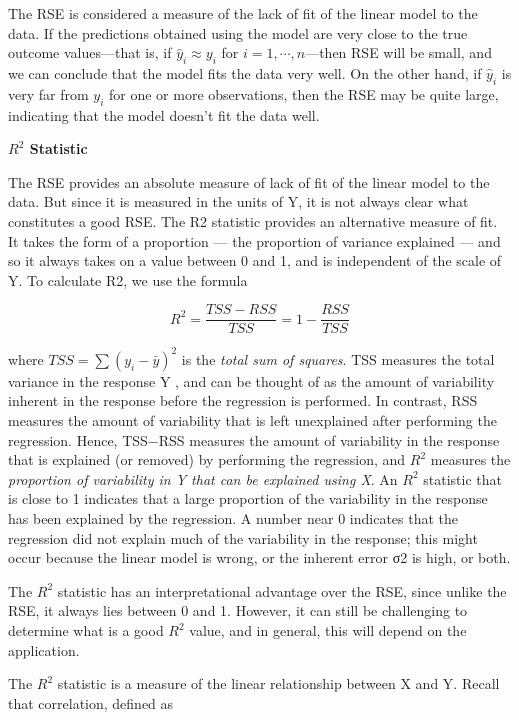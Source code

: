 \documentclass{article}
\theoremstyle{definition}
\theoremstyle{remark}
\begin{document}
	The RSE is considered a measure of the lack of fit of the linear model to the data. If the predictions obtained using the model are very close to the true outcome values---that is, if $\hat{y}_i\approx y_i$ for $i=1,\cdots,n$---then RSE will be small, and we can conclude that the model fits the data very well. On the other hand, if $\hat{y}_i$ is very far from $y_i$ for one or more observations, then the RSE may be quite large, indicating that the model doesn’t fit the data well.
	
	\hspace{\fill}
	
	\textbf{$R^2$ Statistic}
	
	The RSE provides an absolute measure of lack of fit of the linear model  to the data. But since it is measured in the units of Y, it is not always clear what constitutes a good RSE. The R2 statistic provides an alternative measure of fit. It takes the form of a proportion — the proportion of variance explained --- and so it always takes on a value between 0 and 1, and is independent of the scale of Y. To calculate R2, we use the formula
	
	\[
	R^2=\frac{TSS-RSS}{TSS}=1-\frac{RSS}{TSS}
	\]
	
	where $TSS=\sum(y_i-\bar{y})^2$ is the \textit{total sum of squares}. TSS measures the total variance in the response Y , and can be thought of as the amount of variability inherent in the response before the regression is performed. In contrast, RSS measures the amount of variability that is left unexplained after performing the regression. Hence, TSS−RSS measures the amount of variability in the response that is explained (or removed) by performing the regression, and $R^2$ measures the \textit{proportion of variability in Y that can be explained using X}. An $R^2$ statistic that is close to 1 indicates that a large proportion of the variability in the response has been explained by the regression. A number near 0 indicates that the regression did not explain much of the variability in the response; this might occur because the linear model is wrong, or the inherent error σ2 is high, or both.
	
	The $R^2$ statistic has an interpretational advantage over the RSE, since unlike the RSE, it always lies between 0 and 1. However, it can still be challenging to determine what is a good $R^2$ value, and in general, this will depend on the application.
	
	The $R^2$ statistic is a measure of the linear relationship between X and Y. Recall that correlation, defined as
	
\end{document}
